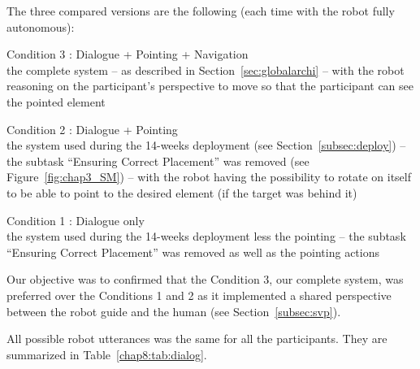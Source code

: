 \documentclass[a4paper,11pt,twoside]{StyleThese}
\begin{document}
The three compared versions are the following (each time with the robot fully autonomous):
\begin{bulletList}
	\item Condition 3 : Dialogue + Pointing + Navigation \\
	\ie the complete system -- as described in Section~\ref{sec:globalarchi} -- with the robot reasoning on the participant's perspective to move so that the participant can see the pointed element
	\item Condition 2 : Dialogue + Pointing \\
	\ie the system used during the 14-weeks deployment (see Section~\ref{subsec:deploy}) -- the subtask ``Ensuring Correct Placement'' was removed (see Figure~\ref{fig:chap3_SM}) -- with the robot having the possibility to rotate on itself to be able to point to the desired element (\eg if the target was behind it)
	\item Condition 1 : Dialogue only \\
	\ie the system used during the 14-weeks deployment less the pointing --  the subtask ``Ensuring Correct Placement'' was removed as well as the pointing actions
\end{bulletList}
Our objective was to confirmed that the Condition 3, our complete system, was preferred over the Conditions 1 and 2 as it implemented a shared perspective between the robot guide and the human (see Section~\ref{subsec:svp}).

All possible robot utterances was the same for all the participants. They are summarized in Table~\ref{chap8:tab:dialog}.
\end{document}
